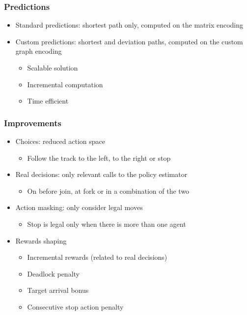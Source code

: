\documentclass{beamer}
\begin{document}
\begin{frame}
	\frametitle{Predictions}
	\begin{itemize}
		\item Standard predictions: shortest path only, computed on the matrix encoding
		\item Custom predictions: shortest and deviation paths, computed on the custom graph encoding
		\begin{itemize}
			\item Scalable solution
			\item Incremental computation		
			\item Time efficient
		\end{itemize}
	\end{itemize}
\end{frame}

\begin{frame}
	\frametitle{Improvements}
	\begin{itemize}
		\item Choices: reduced action space
		\begin{itemize}
			\item Follow the track to the left, to the right or stop
		\end{itemize}
		\item Real decisions: only relevant calls to the policy estimator
		\begin{itemize}
			\item On before join, at fork or in a combination of the two
		\end{itemize}
		\item Action masking: only consider legal moves
		\begin{itemize}
			\item Stop is legal only when there is more than one agent
		\end{itemize}
		\item Rewards shaping
		\begin{itemize}
			\item Incremental rewards (related to real decisions)
			\item Deadlock penalty
			\item Target arrival bonus
			\item Consecutive stop action penalty
		\end{itemize}
	\end{itemize}
\end{frame}
\end{document}
